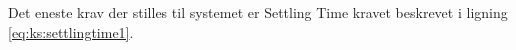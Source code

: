 Det eneste krav der stilles til systemet er Settling Time kravet beskrevet i ligning \ref{eq:ks:settlingtime1}.



